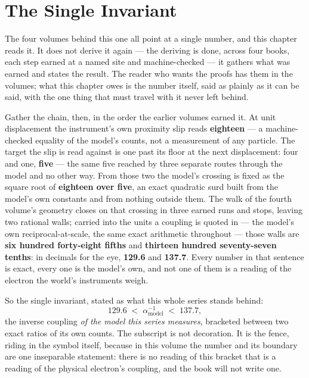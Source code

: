 \chapter{The Single Invariant}

The four volumes behind this one all point at a single number, and this
chapter reads it. It does not derive it again --- the deriving is done,
across four books, each step earned at a named site and machine-checked ---
it gathers what was earned and states the result. The reader who wants the
proofs has them in the volumes; what this chapter owes is the number
itself, said as plainly as it can be said, with the one thing that must
travel with it never left behind.

Gather the chain, then, in the order the earlier volumes earned it. At
unit displacement the instrument's own proximity slip reads
\textbf{eighteen} --- a machine-checked equality of the model's counts, not
a measurement of any particle. The target the slip is read against is one
past its floor at the next displacement: four and one, \textbf{five} ---
the same five reached by three separate routes through the model and no
other way. From those two the model's crossing is fixed as the square root
of \textbf{eighteen over five}, an exact quadratic surd built from the
model's own constants and from nothing outside them. The walk of the fourth
volume's geometry closes on that crossing in three earned runs and stops,
leaving two rational walls; carried into the units a coupling is quoted in
--- the model's own reciprocal-at-scale, the same exact arithmetic
throughout --- those walls are \textbf{six hundred forty-eight fifths} and
\textbf{thirteen hundred seventy-seven tenths}: in decimals for the eye,
\textbf{129.6} and \textbf{137.7}. Every number in that sentence is exact,
every one is the model's own, and not one of them is a reading of the
electron the world's instruments weigh.

So the single invariant, stated as what this whole series stands behind:
\[
  129.6 \;<\; \alpha^{-1}_{\text{model}} \;<\; 137.7,
\]
the inverse coupling \emph{of the model this series measures}, bracketed
between two exact ratios of its own counts. The subscript is not decoration.
It is the fence, riding in the symbol itself, because in this volume the
number and its boundary are one inseparable statement: there is no reading
of this bracket that is a reading of the physical electron's coupling, and
the book will not write one.


